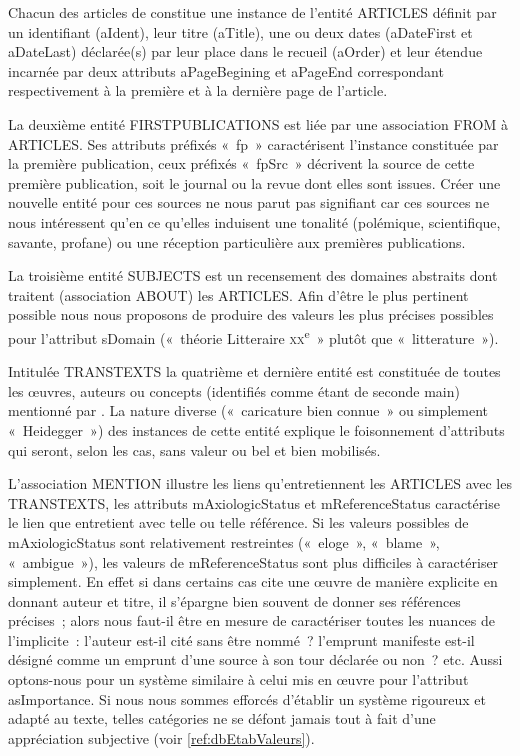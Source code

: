 \documentclass[12pt, a4paper]{article}
\begin{document}
Chacun des articles de \punr{} constitue une instance de l'entité ARTICLES définit par un identifiant (aIdent), leur titre (aTitle), une ou deux dates (aDateFirst et aDateLast) déclarée(s) par \robbe{} leur place dans le recueil (aOrder) et leur étendue incarnée par deux attributs aPageBegining et aPageEnd correspondant respectivement à la première et à la dernière page de l'article.

La deuxième entité FIRSTPUBLICATIONS est liée par une association FROM à 
ARTICLES. Ses attributs préfixés «~fp~» caractérisent l'instance constituée par la première publication, ceux préfixés «~fpSrc~» décrivent la source de cette première publication, soit le journal ou la revue dont elles sont issues. Créer une nouvelle entité pour ces sources ne nous parut pas signifiant car ces sources ne nous intéressent qu'en ce qu'elles induisent une tonalité (polémique, scientifique, savante, profane) ou une réception particulière aux premières publications.

La troisième entité SUBJECTS est un recensement des domaines abstraits dont traitent (association ABOUT) les ARTICLES. Afin d'être le plus pertinent possible nous nous proposons de produire des valeurs les plus précises possibles pour l'attribut sDomain («~théorie Litteraire \textsc{xx}\textsuperscript{e}~» plutôt que «~litterature~»).

Intitulée TRANSTEXTS la quatrième et dernière entité est constituée de toutes les œuvres, auteurs ou concepts (identifiés comme étant de seconde main) mentionné par \robbe{}. La nature diverse («~caricature bien connue~» ou simplement «~Heidegger~») des instances de cette entité explique le foisonnement d'attributs qui seront, selon les cas, sans valeur ou bel et bien mobilisés.

L'association MENTION illustre les liens qu'entretiennent les ARTICLES avec les TRANSTEXTS, les attributs mAxiologicStatus et mReferenceStatus caractérise le lien que \punr{} entretient avec telle ou telle référence. Si les valeurs possibles de mAxiologicStatus sont relativement restreintes («~eloge~», «~blame~», «~ambigue~»), les valeurs de mReferenceStatus sont plus difficiles à caractériser simplement. En effet si dans certains cas \robbe{} cite une œuvre de manière explicite en donnant auteur et titre, il s'épargne bien souvent de donner ses références précises~; alors nous faut-il être en mesure de caractériser toutes les nuances de l'implicite~: l'auteur est-il cité sans être nommé~? l'emprunt manifeste est-il désigné comme un emprunt d'une source à son tour déclarée ou non~? etc. Aussi optons-nous pour un système similaire à celui mis en œuvre pour l'attribut asImportance. Si nous nous sommes efforcés d'établir un système rigoureux et adapté au texte, telles catégories ne se défont jamais tout à fait d'une appréciation subjective (voir \ref{ref:dbEtabValeurs}).
\end{document}

